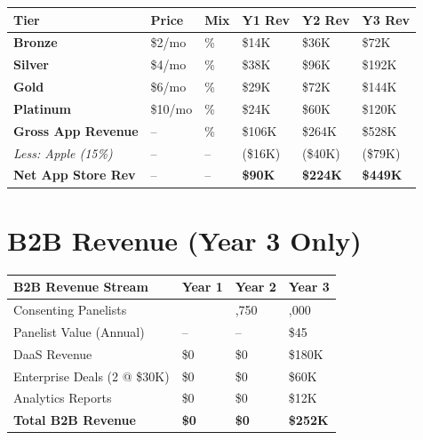 \documentclass[11pt,a4paper]{report}
\begin{document}
\begin{center}
\renewcommand{\arraystretch}{1.4}
\begin{tabular}{>{\raggedright\arraybackslash}p{2.5cm} >{\centering\arraybackslash}p{1.3cm} >{\centering\arraybackslash}p{1.5cm} >{\centering\arraybackslash}p{2cm} >{\centering\arraybackslash}p{2cm} >{\centering\arraybackslash}p{2cm}}
\toprule
\rowcolor{miloprimary!15}
\textbf{Tier} & \textbf{Price} & \textbf{Mix} & \textbf{Y1 Rev} & \textbf{Y2 Rev} & \textbf{Y3 Rev} \\
\midrule
\rowcolor{bronzecolor!8}
\textcolor{bronzecolor}{\textbf{Bronze}} & \$2/mo & 30\% & \$14K & \$36K & \$72K \\
\rowcolor{silvercolor!8}
\textcolor{silvercolor}{\textbf{Silver}} & \$4/mo & 40\% & \$38K & \$96K & \$192K \\
\rowcolor{goldcolor!8}
\textcolor{goldcolor}{\textbf{Gold}} & \$6/mo & 20\% & \$29K & \$72K & \$144K \\
\rowcolor{platinumcolor!8}
\textcolor{platinumcolor}{\textbf{Platinum}} & \$10/mo & 10\% & \$24K & \$60K & \$120K \\
\midrule
\rowcolor{lightbg}
\textbf{Gross App Revenue} & -- & 100\% & \$106K & \$264K & \$528K \\
\rowcolor{dangerred!8}
\textit{Less: Apple (15\%)} & -- & -- & (\$16K) & (\$40K) & (\$79K) \\
\rowcolor{successgreen!10}
\textbf{Net App Store Rev} & -- & -- & \textbf{\$90K} & \textbf{\$224K} & \textbf{\$449K} \\
\bottomrule
\end{tabular}
\end{center}

\section{B2B Revenue (Year 3 Only)}

\begin{center}
\renewcommand{\arraystretch}{1.4}
\begin{tabular}{>{\raggedright\arraybackslash}p{4cm} >{\centering\arraybackslash}p{2.5cm} >{\centering\arraybackslash}p{2.5cm} >{\centering\arraybackslash}p{2.5cm}}
\toprule
\rowcolor{datapurple!15}
\textbf{B2B Revenue Stream} & \textbf{Year 1} & \textbf{Year 2} & \textbf{Year 3} \\
\midrule
Consenting Panelists & 600 & 1,750 & 4,000 \\
\rowcolor{lightbg}
Panelist Value (Annual) & -- & -- & \$45 \\
DaaS Revenue & \$0 & \$0 & \$180K \\
\rowcolor{lightbg}
Enterprise Deals (2 @ \$30K) & \$0 & \$0 & \$60K \\
Analytics Reports & \$0 & \$0 & \$12K \\
\midrule
\rowcolor{successgreen!10}
\textbf{Total B2B Revenue} & \textbf{\$0} & \textbf{\$0} & \textbf{\$252K} \\
\bottomrule
\end{tabular}
\end{center}
\end{document}
